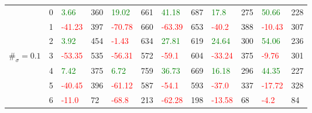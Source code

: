 \begin{table}[!htb]
\begin{adjustwidth}{-0.8in}{-0.9in}
\begin{tabular}{|p{4em}|p{2em}|p{3em}|p{3em}|p{3em}|p{3em}|p{3em}|p{3em}|p{3em}|p{3em}|p{3em}|p{3em}|}
            & 0 & \textcolor{green}{3.66} & 360 & \textcolor{green}{19.02} & 661 & \textcolor{green}{41.18} & 687 & \textcolor{green}{17.8} & 275 & \textcolor{green}{50.66} & 228\\\cline{3-12}
            & 1 & \textcolor{red}{-41.23} & 397 & \textcolor{red}{-70.78} & 660 & \textcolor{red}{-63.39} & 653 & \textcolor{red}{-40.2} & 388 & \textcolor{red}{-10.43} & 307\\\cline{3-12}
            & 2 & \textcolor{green}{3.92} & 454 & \textcolor{red}{-1.43} & 634 & \textcolor{green}{27.81} & 619 & \textcolor{green}{24.64} & 300 & \textcolor{green}{54.06} & 236\\\cline{3-12}
            $\#_{\sigma}=0.1$ & 3 & \textcolor{red}{-53.35} & 535 & \textcolor{red}{-56.31} & 572 & \textcolor{red}{-59.1} & 604 & \textcolor{red}{-33.24} & 375 & \textcolor{red}{-9.76} & 301\\\cline{3-12}
            & 4 & \textcolor{green}{7.42} & 375 & \textcolor{green}{6.72} & 759 & \textcolor{green}{36.73} & 669 & \textcolor{green}{16.18} & 296 & \textcolor{green}{44.35} & 227\\\cline{3-12}
            & 5 & \textcolor{red}{-40.45} & 396 & \textcolor{red}{-61.12} & 587 & \textcolor{red}{-54.1} & 593 & \textcolor{red}{-37.0} & 337 & \textcolor{red}{-17.72} & 328\\\cline{3-12}
            & 6 & \textcolor{red}{-11.0} & 72 & \textcolor{red}{-68.8} & 213 & \textcolor{red}{-62.28} & 198 & \textcolor{red}{-13.58} & 68 & \textcolor{red}{-4.2} & 84\\\hline\hline


\end{tabular}
\end{adjustwidth}
\end{table}
